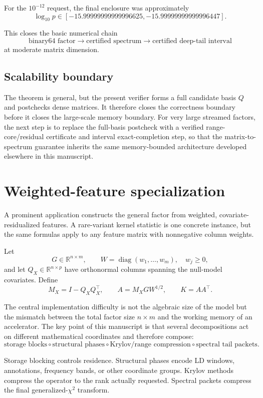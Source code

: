 \documentclass[11pt]{article}
\theoremstyle{definition}
\theoremstyle{remark}
\begin{document}
For the \(10^{-12}\) request, the final enclosure was approximately
\[
\log_{10}p
\in
[-15.99999999999996625,
 -15.99999999999996447].
\]

This closes the basic numerical chain
\[
\boxed{
\text{binary64 factor}
\longrightarrow
\text{certified spectrum}
\longrightarrow
\text{certified deep-tail interval}
}
\]
at moderate matrix dimension.

\subsection{Scalability boundary}

The theorem is general, but the present verifier forms a full candidate
basis \(Q\) and postchecks dense matrices.  It therefore closes the correctness
boundary before it closes the large-scale memory boundary.  For very large
streamed factors, the next step is to replace the full-basis postcheck with a
verified range-core/residual certificate and interval exact-completion step,
so that the matrix-to-spectrum guarantee inherits the same memory-bounded
architecture developed elsewhere in this manuscript.


\section{Weighted-feature specialization}\label{sec:final-7}

A prominent application constructs the general factor from weighted,
covariate-residualized features.  A rare-variant kernel statistic is one concrete instance, but the same
formulas apply to any feature matrix with nonnegative column weights.

Let
\[
G\in\mathbb R^{n\times m},
\qquad
W=\operatorname{diag}(w_1,\ldots,w_m),
\quad w_j\ge 0,
\]
and let \(Q_X\in\mathbb R^{n\times p}\) have orthonormal columns spanning
the null-model covariates.  Define
\[
M_X=I-Q_XQ_X^\top,
\qquad
A=M_XGW^{1/2},
\qquad
K=AA^\top.
\]

The central implementation difficulty is not the algebraic size of the
model but the mismatch between the total factor size \(n\times m\) and the
working memory of an accelerator.  The key point of this manuscript is that
several decompositions act on different mathematical coordinates and therefore
compose:
\[
\boxed{
\text{storage blocks}
\circ
\text{structural phases}
\circ
\text{Krylov/range compression}
\circ
\text{spectral tail packets}.
}
\]

Storage blocking controls residence.  Structural phases encode LD windows,
annotations, frequency bands, or other coordinate groups.  Krylov methods
compress the operator to the rank actually requested.  Spectral packets
compress the final generalized-\(\chi^2\) transform.
\end{document}
